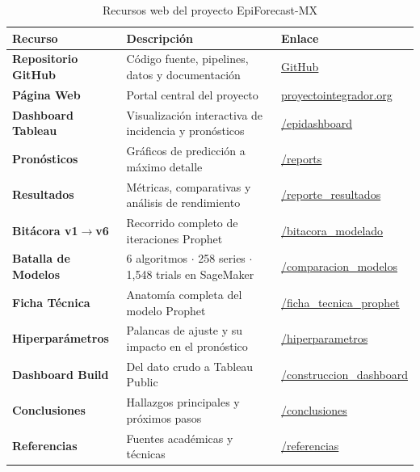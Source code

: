 \documentclass[12pt, letterpaper]{article}
\begin{document}
\begin{table}[H]
\centering
\caption{Recursos web del proyecto EpiForecast-MX}
\label{tab:enlaces}
\scriptsize
\setlength{\tabcolsep}{4pt}
\begin{tabularx}{\textwidth}{>{\bfseries}l X l}
\toprule
\textbf{Recurso} & \textbf{Descripción} & \textbf{Enlace} \\
\midrule
Repositorio GitHub & Código fuente, pipelines, datos y documentación & \href{https://github.com/IntegradorIMSS2026Team01/EpiForecast-MX}{GitHub} \\
Página Web & Portal central del proyecto & \href{https://proyectointegrador.org}{proyectointegrador.org} \\
Dashboard Tableau & Visualización interactiva de incidencia y pronósticos & \href{https://proyectointegrador.org/epidashboard}{/epidashboard} \\
Pronósticos & Gráficos de predicción a máximo detalle & \href{https://proyectointegrador.org/reports/}{/reports} \\
Resultados & Métricas, comparativas y análisis de rendimiento & \href{https://proyectointegrador.org/reporte_resultados}{/reporte\_resultados} \\
Bitácora v1$\to$v6 & Recorrido completo de iteraciones Prophet & \href{https://proyectointegrador.org/bitacora_modelado}{/bitacora\_modelado} \\
Batalla de Modelos & 6 algoritmos $\cdot$ 258 series $\cdot$ 1,548 trials en SageMaker & \href{https://proyectointegrador.org/comparacion_modelos}{/comparacion\_modelos} \\
Ficha Técnica & Anatomía completa del modelo Prophet & \href{https://proyectointegrador.org/ficha_tecnica_prophet}{/ficha\_tecnica\_prophet} \\
Hiperparámetros & Palancas de ajuste y su impacto en el pronóstico & \href{https://proyectointegrador.org/hiperparametros_modelos}{/hiperparametros} \\
Dashboard Build & Del dato crudo a Tableau Public & \href{https://proyectointegrador.org/construccion_dashboard}{/construccion\_dashboard} \\
Conclusiones & Hallazgos principales y próximos pasos & \href{https://proyectointegrador.org/conclusiones}{/conclusiones} \\
Referencias & Fuentes académicas y técnicas & \href{https://proyectointegrador.org/referencias}{/referencias} \\
\bottomrule
\end{tabularx}
\end{table}
\end{document}
